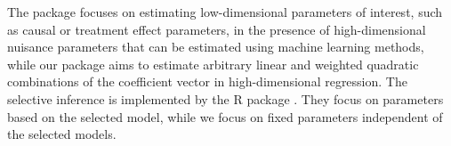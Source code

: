 The  package focuses on estimating low-dimensional parameters of interest, such as causal or treatment effect parameters, in the presence of high-dimensional nuisance parameters that can be estimated using machine learning methods, while our package aims to estimate arbitrary linear and weighted quadratic combinations of the coefficient vector in high-dimensional regression.
The selective inference is implemented by the R package . They focus on parameters based on the selected model, while we focus on fixed parameters independent of the selected models. 

    
